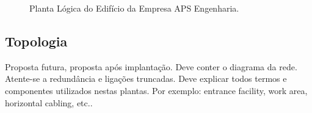 \documentclass[	DIV=calc,%
							paper=a4,%
							fontsize=12pt,%
							onecolumn]{scrartcl}	 					%
\begin{document}
\begin{figure}
	\noindent{}
	\caption{Planta Lógica do Edifício da Empresa APS Engenharia.}
	\label{plantalogica}
\end{figure}

\clearpage
{}
\recalctypearea


\subsection{Topologia}
Proposta futura, proposta após implantação.
Deve conter o diagrama da rede. Atente-se a redundância  e ligações truncadas.
Deve explicar todos termos e componentes utilizados nestas plantas. Por exemplo: entrance facility, work area, horizontal cabling, etc..
\end{document}
